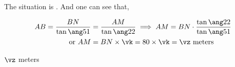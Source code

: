 \begin{solution}[\halfpage]
	The situation is \asif. And one can see that,
	
	\begin{align}
		AB = \dfrac{BN}{\tan\ang\vb} &= \dfrac{AM}{\tan\ang\va} \implies AM = BN\cdot\dfrac{\tan\ang\va}{\tan\ang\vb} \\
		\text{or } AM &= BN\times\vk = \vh\times\vk = \vz\text{ meters}
	\end{align}
\end{solution}

\ifprintanswers\begin{codex}$\vz$ meters\end{codex}\fi
